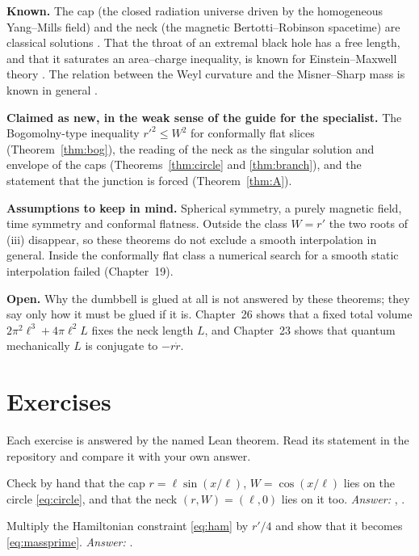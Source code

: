 \begin{standsbox}
\textbf{Known.} The cap (the closed radiation universe driven by the homogeneous Yang--Mills field) and the neck (the magnetic Bertotti--Robinson spacetime) are classical solutions \cite{Tolman,Bertotti,Robinson}. That the throat of an extremal black hole has a free length, and that it saturates an area--charge inequality, is known for Einstein--Maxwell theory \cite{DJR,CM}. The relation between the Weyl curvature and the Misner--Sharp mass is known in general \cite{MS}.

\textbf{Claimed as new, in the weak sense of the guide for the specialist.} The Bogomolny-type inequality $r'^2\le W^2$ for conformally flat slices (Theorem~\ref{thm:bog}), the reading of the neck as the singular solution and envelope of the caps (Theorems~\ref{thm:circle} and \ref{thm:branch}), and the statement that the junction is forced (Theorem~\ref{thm:A}).

\textbf{Assumptions to keep in mind.} Spherical symmetry, a purely magnetic field, time symmetry and conformal flatness. Outside the class $W=r'$ the two roots of (iii) disappear, so these theorems do not exclude a smooth interpolation in general. Inside the conformally flat class a numerical search for a smooth static interpolation failed \negative{} (Chapter~19).

\textbf{Open.} Why the dumbbell is glued at all is not answered by these theorems; they say only how it must be glued if it is. Chapter~26 shows that a fixed total volume $2\pi^2\ell^3+4\pi\ell^2L$ fixes the neck length $L$, and Chapter~23 shows that quantum mechanically $L$ is conjugate to $-r\dot r$. \open
\end{standsbox}

\section*{Exercises}
Each exercise is answered by the named Lean theorem. Read its statement in the repository and compare it with your own answer.

\begin{exercise}
Check by hand that the cap $r=\ell\sin(x/\ell)$, $W=\cos(x/\ell)$ lies on the circle \eqref{eq:circle}, and that the neck $(r,W)=(\ell,0)$ lies on it too. \emph{Answer:} , .
\end{exercise}

\begin{exercise}
Multiply the Hamiltonian constraint \eqref{eq:ham} by $r'/4$ and show that it becomes \eqref{eq:massprime}. \emph{Answer:} .
\end{exercise}

